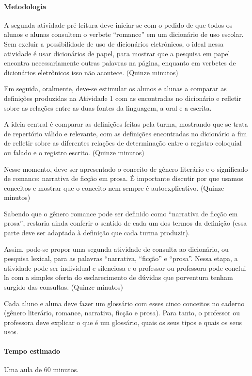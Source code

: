 \documentclass[12pt]{extarticle}
\begin{document}
\paragraph{Metodologia}
A segunda atividade pré-leitura deve iniciar-se com o pedido de que
todos os alunos e alunas consultem o verbete ``romance'' em um
dicionário de uso escolar. Sem excluir a possibilidade de uso de
dicionários eletrônicos, o ideal nessa atividade é usar dicionários de
papel, para mostrar que a pesquisa em papel encontra necessariamente
outras palavras na página, enquanto em verbetes de dicionários
eletrônicos isso não acontece. (Quinze minutos)

Em seguida, oralmente, deve-se estimular os alunos e alunas a comparar
as definições produzidas na Atividade 1 com as encontradas no dicionário
e refletir sobre as relações entre as duas fontes da linguagem, a oral e
a escrita.

A ideia central é comparar as definições feitas pela turma, mostrando
que se trata de repertório válido e relevante, com as definições
encontradas no dicionário a fim de refletir sobre as diferentes relações
de determinação entre o registro coloquial ou falado e o registro
escrito. (Quinze minutos)

Nesse momento, deve ser apresentado o conceito de gênero literário e o
significado de romance: narrativa de ficção em prosa. É importante
discutir por que usamos conceitos e mostrar que o conceito nem sempre é
autoexplicativo. (Quinze minutos)

Sabendo que o gênero romance pode ser definido como ``narrativa de
ficção em prosa'', restaria ainda conferir o sentido de cada um dos
termos da definição (essa parte deve ser adaptada à definição que cada
turma produzir).

Assim, pode-se propor uma segunda atividade de consulta ao dicionário,
ou pesquisa lexical, para as palavras ``narrativa, ``ficção'' e
``prosa''. Nessa etapa, a atividade pode ser individual e silenciosa e o
professor ou professora pode conclui-la com a simples oferta do
esclarecimento de dúvidas que porventura tenham surgido das consultas.
(Quinze minutos)

Cada aluno e aluna deve fazer um glossário com esses cinco conceitos no
caderno (gênero literário, romance, narrativa, ficção e prosa). Para
tanto, o professor ou professora deve explicar o que é um glossário,
quais os seus tipos e quais os seus usos.

\paragraph{Tempo estimado} Uma aula de 60 minutos.
\end{document}
